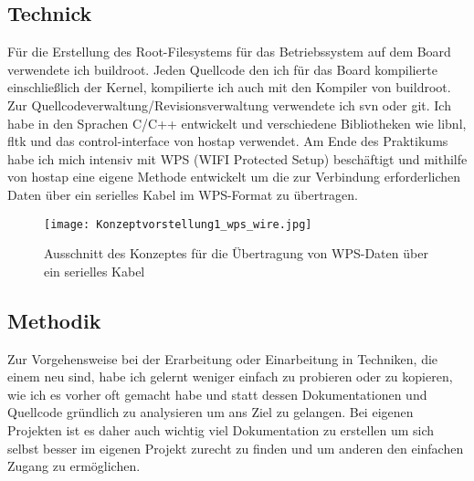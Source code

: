 \documentclass[pdftex,12pt,a4paper]{scrartcl}
\begin{document}
\subsection{Technick}
Für die Erstellung des Root-Filesystems für das Betriebssystem auf dem Board verwendete ich buildroot. Jeden Quellcode den ich für das Board kompilierte einschließlich der Kernel, kompilierte ich auch mit den Kompiler von buildroot. Zur Quellcodeverwaltung/Revisionsverwaltung verwendete ich svn oder git. Ich habe in den Sprachen C/C++ entwickelt und verschiedene Bibliotheken wie libnl, fltk und das control-interface von hostap verwendet. Am Ende des Praktikums habe ich mich intensiv mit WPS (WIFI Protected Setup) beschäftigt und mithilfe von hostap eine eigene Methode entwickelt um die zur Verbindung erforderlichen Daten über ein serielles Kabel im WPS-Format zu übertragen.
\begin{figure}[H] %
    \centering
\texttt{[image: Konzeptvorstellung1\_wps\_wire.jpg]}
    \caption{Ausschnitt des Konzeptes für die Übertragung von WPS-Daten über ein serielles Kabel}
\end{figure}
\subsection{Methodik}
Zur Vorgehensweise bei der Erarbeitung oder Einarbeitung in Techniken, die einem neu sind, habe ich gelernt weniger einfach zu probieren oder zu kopieren, wie ich es vorher oft gemacht habe und statt dessen Dokumentationen und Quellcode gründlich zu analysieren um ans Ziel zu gelangen.
Bei eigenen Projekten ist es daher auch wichtig viel Dokumentation zu erstellen um sich selbst besser im eigenen Projekt zurecht zu finden und um anderen den einfachen Zugang zu ermöglichen.
\end{document}
